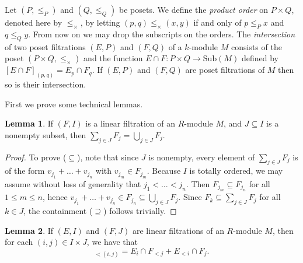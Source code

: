 \documentclass[oneside,11pt]{amsart}
\newcommand{\Sub}{\ensuremath{\text{Sub}}}
\theoremstyle{definition}
\newtheorem{proof techniques}{Proof Techniques}
\newtheorem{lemma}{Lemma}
\begin{document}
Let $(P , \leq_P)$ and $(Q , \leq_Q)$ be posets. We define the \emph{product order} on $P \times Q$, denoted here by $\leq_\times$, by letting $(p , q) \leq_\times (x , y)$ if and only of $p \leq_P x$ and $q \leq_Q y$. From now on we may drop the subscripts on the orders. The \emph{intersection} of two poset filtrations $(E , P)$ and $(F , Q)$ of a $k$-module $M$ consists of the poset $(P \times Q, \leq_\times)$ and the function $E \cap F: P \times Q \to \Sub(M)$ defined by $[E \cap F]_{(p , q)} = E_p \cap F_q$. If $(E , P)$ and $(F , Q)$ are poset filtrations of $M$ then so is their intersection. 

First we prove some technical lemmas. 

\begin{lemma}\label{lem: nested sums and unions}
If $(F , I)$ is a linear filtration of an $R$-module $M$, and $J \subseteq I$ is a nonempty subset, then $\sum_{j \in J} F_j = \bigcup_{j \in J} F_j$. 
\end{lemma}

\begin{proof}
To prove ($\subseteq$), note that since $J$ is nonempty, every element of $\sum_{j \in J} F_j$ is of the form $v_{j_1} + \ldots + v_{j_n}$ with $v_{j_m} \in F_{j_m}$. Because $I$ is totally ordered, we may assume without loss of generality that $j_1 < \ldots < j_n$. Then $F_{j_m} \subseteq F_{j_n}$ for all $1 \leq m \leq n$, hence $v_{j_1} + \ldots + v_{j_n} \in F_{j_n} \subseteq \bigcup_{j \in J} F_j$. Since $F_k \subseteq \sum_{j \in J} F_j$ for all $k \in J$, the containment ($\supseteq$) follows trivially. 
\end{proof}

\begin{lemma}
If $(E , I)$ and $(F , J)$ are linear filtrations of an $R$-module $M$, then for each $(i , j) \in I \times J$, we have that 
\begin{equation*}
[E \cap F]_{< (i , j)} = E_i \cap F_{< j} + E_{< i} \cap F_j. 
\end{equation*}
\end{lemma}
\end{document}
